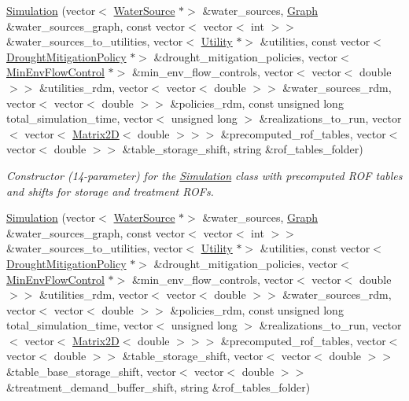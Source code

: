 \begin{DoxyCompactItemize}
\mbox{\hyperlink{classSimulation_aa225c1836ebd788eb0f35c8cd53f0533}{Simulation}} (vector$<$ \mbox{\hyperlink{classWaterSource}{Water\+Source}} $\ast$$>$ \&water\+\_\+sources, \mbox{\hyperlink{classGraph}{Graph}} \&water\+\_\+sources\+\_\+graph, const vector$<$ vector$<$ int $>$$>$ \&water\+\_\+sources\+\_\+to\+\_\+utilities, vector$<$ \mbox{\hyperlink{classUtility}{Utility}} $\ast$$>$ \&utilities, const vector$<$ \mbox{\hyperlink{classDroughtMitigationPolicy}{Drought\+Mitigation\+Policy}} $\ast$$>$ \&drought\+\_\+mitigation\+\_\+policies, vector$<$ \mbox{\hyperlink{classMinEnvFlowControl}{Min\+Env\+Flow\+Control}} $\ast$$>$ \&min\+\_\+env\+\_\+flow\+\_\+controls, vector$<$ vector$<$ double $>$$>$ \&utilities\+\_\+rdm, vector$<$ vector$<$ double $>$$>$ \&water\+\_\+sources\+\_\+rdm, vector$<$ vector$<$ double $>$$>$ \&policies\+\_\+rdm, const unsigned long total\+\_\+simulation\+\_\+time, vector$<$ unsigned long $>$ \&realizations\+\_\+to\+\_\+run, vector$<$ vector$<$ \mbox{\hyperlink{classMatrix2D}{Matrix2D}}$<$ double $>$$>$$>$ \&precomputed\+\_\+rof\+\_\+tables, vector$<$ vector$<$ double $>$$>$ \&table\+\_\+storage\+\_\+shift, string \&rof\+\_\+tables\+\_\+folder)
\begin{DoxyCompactList}\small\item\em Constructor (14-\/parameter) for the \mbox{\hyperlink{classSimulation}{Simulation}} class with precomputed R\+OF tables and shifts for storage and treatment R\+O\+Fs. \end{DoxyCompactList}\item 
\mbox{\hyperlink{classSimulation_a99c76e396f63ca8f98d362c76804345b}{Simulation}} (vector$<$ \mbox{\hyperlink{classWaterSource}{Water\+Source}} $\ast$$>$ \&water\+\_\+sources, \mbox{\hyperlink{classGraph}{Graph}} \&water\+\_\+sources\+\_\+graph, const vector$<$ vector$<$ int $>$$>$ \&water\+\_\+sources\+\_\+to\+\_\+utilities, vector$<$ \mbox{\hyperlink{classUtility}{Utility}} $\ast$$>$ \&utilities, const vector$<$ \mbox{\hyperlink{classDroughtMitigationPolicy}{Drought\+Mitigation\+Policy}} $\ast$$>$ \&drought\+\_\+mitigation\+\_\+policies, vector$<$ \mbox{\hyperlink{classMinEnvFlowControl}{Min\+Env\+Flow\+Control}} $\ast$$>$ \&min\+\_\+env\+\_\+flow\+\_\+controls, vector$<$ vector$<$ double $>$$>$ \&utilities\+\_\+rdm, vector$<$ vector$<$ double $>$$>$ \&water\+\_\+sources\+\_\+rdm, vector$<$ vector$<$ double $>$$>$ \&policies\+\_\+rdm, const unsigned long total\+\_\+simulation\+\_\+time, vector$<$ unsigned long $>$ \&realizations\+\_\+to\+\_\+run, vector$<$ vector$<$ \mbox{\hyperlink{classMatrix2D}{Matrix2D}}$<$ double $>$$>$$>$ \&precomputed\+\_\+rof\+\_\+tables, vector$<$ vector$<$ double $>$$>$ \&table\+\_\+storage\+\_\+shift, vector$<$ vector$<$ double $>$$>$ \&table\+\_\+base\+\_\+storage\+\_\+shift, vector$<$ vector$<$ double $>$$>$ \&treatment\+\_\+demand\+\_\+buffer\+\_\+shift, string \&rof\+\_\+tables\+\_\+folder)

\end{DoxyCompactItemize}
